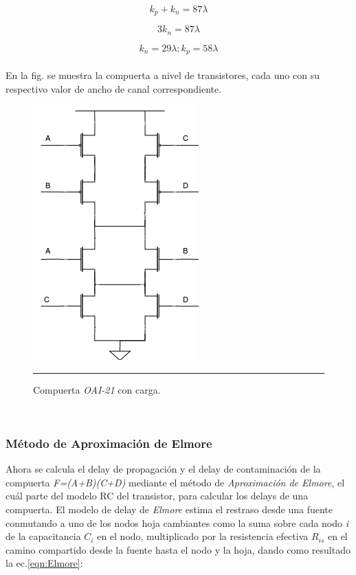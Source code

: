 \documentclass[12pt,a4paper]{article} %
\begin{document}
\begin{equation}\label{eqn:k4}
k_p + k_n = 87\lambda
\end{equation}

\begin{equation}\label{eqn:k5}
3k_n = 87\lambda
\end{equation}

\begin{equation}\label{eqn:k6}
k_n = 29\lambda ; k_p = 58\lambda
\end{equation}\\

En la fig. se muestra la compuerta a nivel de transistores, cada uno con su respectivo valor de ancho de canal correspondiente.\\

\begin{figure}[htbp]
  \centering
    \includegraphics[scale=0.5]{./Comp_Transistores.png}
    \rule{35em}{0.5pt}
  \caption[IdealvsSim]{Compuerta \textit{OAI-21} con carga.}
  \label{fig:Comp_Transistores}
\end{figure}\\


\subsubsection{Método de Aproximación de Elmore}

Ahora se calcula el delay de propagación y el delay de contaminación de la compuerta \textit{F=(A+B)(C+D)} mediante el método de \textit{Aproximación de Elmore}, el cuál parte del modelo RC del transistor, para calcular los delays de una compuerta. El modelo de delay de \textit{Elmore} estima el restraso desde una fuente conmutando a uno de los nodos hoja cambiantes como la suma sobre cada nodo \textit{i} de la capacitancia \textit{$C_{i}$} en el nodo, multiplicado por la resistencia efectiva \textit{$R_{is}$} en el camino compartido desde la fuente hasta el nodo y la hoja, dando como resultado la ec.\ref{eqn:Elmore}:
\end{document}

